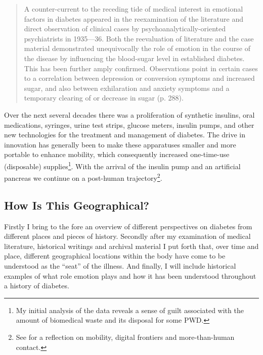 \documentclass[12pt]{article}
\begin{document}
\begin{singlespace}
  \begin{quote} 
A counter-current to the receding tide of medical interest in emotional factors in diabetes appeared in the reexamination of the literature and direct observation of 
clinical cases by psychoanalytically-oriented psychiatrists in 1935—36. Both the reevaluation of literature and the case material demonstrated unequivocally the role of 
emotion in the course of the disease by influencing the blood-sugar level in established diabetes. This has been further amply confirmed. Observations point in certain cases 
to a correlation between depression or conversion symptoms and increased sugar, and also between exhilaration and anxiety symptoms and a temporary clearing of or decrease
in sugar (p. 288).\end{quote} 
    \end{singlespace}

Over the next several decades there was a proliferation of synthetic insulins, oral medications, syringes, urine test strips, glucose meters, insulin pumps, and other new technologies \citep{phillip_attd_2012} for the treatment and management of diabetes. The drive in innovation has generally been to make these apparatuses smaller and more portable to enhance mobility, which consequently increased one-time-use (disposable) supplies\footnote{My initial analysis of the data reveals a sense of guilt associated with the amount of biomedical waste and its disposal for some PWD.}. With the arrival of the insulin pump and an artificial pancreas we continue on a post-human trajectory\footnote{See \citet{wilson_more_2011} for a reflection on mobility, digital frontiers and more-than-human contact.}.  

\subsection{How Is This Geographical?}
Firstly I bring to the fore an overview of different perspectives on diabetes from different places and pieces of history. Secondly after my examination of medical literature, historical writings and archival material I put forth that, over time and place, different geographical locations within the body have come to be understood as the ``seat'' of the illness. And finally, I will include historical examples of what role emotion plays and how it has been understood throughout a history of diabetes. 
\end{document}

